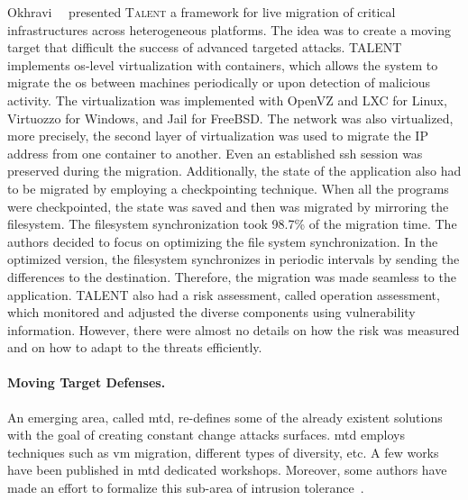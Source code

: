 Okhravi~\etal{}~\cite{Okhravi:2014} presented \textsc{Talent} a framework for live migration of critical infrastructures across heterogeneous platforms. 
The idea was to create a moving target that difficult the success of advanced targeted attacks. 
TALENT implements \gls{os}-level virtualization with containers, which allows the system to migrate the \gls{os} between machines periodically or upon detection of malicious activity. 
The virtualization was implemented with OpenVZ and LXC for Linux, Virtuozzo for Windows, and Jail for FreeBSD. 
The network was also virtualized, more precisely, the second layer of virtualization was used to migrate the IP address from one container to another. 
Even an established ssh session was preserved during the migration. 
Additionally, the state of the application also had to be migrated by employing a checkpointing technique. 
When all the programs were checkpointed, the state was saved and then was migrated by mirroring the filesystem. 
The filesystem synchronization took 98.7\% of the migration time. 
The authors decided to focus on optimizing the file system synchronization. 
In the optimized version, the filesystem synchronizes in periodic intervals by sending the differences to the destination. 
Therefore, the migration was made seamless to the application. 
TALENT also had a risk assessment, called operation assessment, which monitored and adjusted the diverse components using vulnerability information. 
However, there were almost no details on how the risk was measured and on how to adapt to the threats efficiently.


\paragraph{Moving Target Defenses.} 
An emerging area, called \gls{mtd}, re-defines some of the already existent solutions with the goal of creating constant change attacks surfaces. 
\gls{mtd} employs techniques such as  \gls{vm} migration, different types of diversity, etc.
A few works have been published in \gls{mtd} dedicated workshops.
Moreover, some authors have made an effort to formalize this sub-area of intrusion tolerance~\cite{Zhuang:2014}.  


